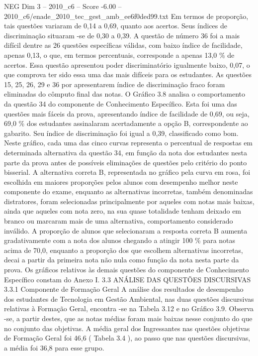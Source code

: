 \begin{textsample}{NEG Dim 3 – 2010\_c6 – Score -6.00 – 2010\_c6/enade\_2010\_tec\_gest\_amb\_ee6f0ded99.txt}
Em termos de proporção, tais questões variaram de 0,14 a 0,69, quanto aos acertos.
Seus índices de discriminação situaram -se de 0,30 a 0,39.
A questão de número 36 foi a mais difícil dentre as 26 questões específicas válidas, com baixo índice de facilidade, apenas 0,13, o que, em termos percentuais, corresponde a apenas 13,0 \% de acertos.
Essa questão apresentou poder discriminatório igualmente baixo, 0,07, o que comprova ter sido essa uma das mais difíceis para os estudantes.
As questões 15, 25, 26, 29 e 36 por apresentarem índice de discriminação fraco foram eliminadas do cômputo final das notas.
O Gráfico 3.8 analisa o comportamento da questão 34 do componente de Conhecimento Específico.
Esta foi uma das questões mais fáceis da prova, apresentando índice de facilidade de 0,69, ou seja, 69,0 \% dos estudantes assinalaram acertadamente a opção B, correspondente ao gabarito.
Seu índice de discriminação foi igual a 0,39, classificado como bom.
Neste gráfico, cada uma das cinco curvas representa o percentual de respostas em determinada alternativa da questão 34, em função da nota dos estudantes nesta parte da prova antes de possíveis eliminações de questões pelo critério do ponto bisserial.
A alternativa correta B, representada no gráfico pela curva em rosa, foi escolhida em maiores proporções pelos alunos com desempenho melhor neste componente do exame, enquanto as alternativas incorretas, também denominadas distratores, foram selecionadas principalmente por aqueles com notas mais baixas, ainda que aqueles com nota zero, na sua quase totalidade tenham deixado em branco ou marcaram mais de uma alternativa, comportamento considerado inválido.
A proporção de alunos que selecionaram a resposta correta B aumenta gradativamente com a nota dos alunos chegando a atingir 100 \% para notas acima de 70,0, enquanto a proporção dos que escolhem alternativas incorretas, decai a partir da primeira nota não nula como função da nota nesta parte da prova.
Os gráficos relativos às demais questões do componente de Conhecimento Específico constam do Anexo I. 3.3 ANÁLISE DAS QUESTÕES DISCURSIVAS 3.3.1 Componente de Formação Geral A análise dos resultados de desempenho dos estudantes de Tecnologia em Gestão Ambiental, nas duas questões discursivas relativas à Formação Geral, encontra -se na Tabela 3.12 e no Gráfico 3.9.
Observa -se, a partir destes, que as notas médias foram mais baixas nesse conjunto do que no conjunto das objetivas.
A média geral dos Ingressantes nas questões objetivas de Formação Geral foi 46,6 ( Tabela 3.4 ), ao passo que nas questões discursivas, a média foi 36,8 para esse grupo.

\end{textsample}
